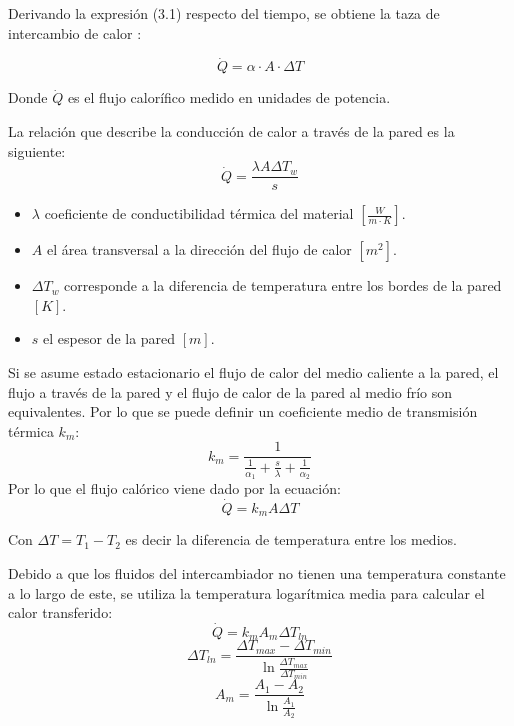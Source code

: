 \documentclass[letterpaper,11pt]{article} %
\begin{document}
 Derivando la expresión (3.1) respecto del tiempo, se obtiene la taza de intercambio de calor :
 
 \begin{equation}
     \dot Q = \alpha \cdot A \cdot \Delta T
 \end{equation}

 Donde $\dot Q$ es el flujo calorífico medido en unidades de potencia.
 
La relación que describe la conducción de calor a través de la pared es la siguiente:
\begin{equation}
    \Dot{Q} = \frac{\lambda A \Delta T_w}{s}
\end{equation}
\begin{itemize}
    \item $\lambda$ coeficiente de conductibilidad térmica del material $[\frac{W}{m\cdot K}]$.
    \item $A$ el área transversal a la dirección del flujo de calor $[m^2]$.
    \item $\Delta T_w$ corresponde a la diferencia de temperatura entre los bordes de la pared $[K]$.
    \item $s$ el espesor de la pared $[m]$.
\end{itemize}

Si se asume estado estacionario el flujo de calor del medio caliente a la pared, el flujo a través de la pared y el flujo de calor de la pared al medio frío son equivalentes.  Por lo que se puede definir un coeficiente medio de transmisión térmica $k_m$:
\begin{equation}
    k_m = \frac{1}{\frac{1}{\alpha_1}+\frac{s}{\lambda}+\frac{1}{\alpha_2}}
\end{equation}
Por lo que el flujo calórico viene dado por la ecuación:
\begin{equation}
    \Dot{Q} = k_m A \Delta T
\end{equation}

Con $\Delta T = T_1 - T_2$ es decir la diferencia de temperatura entre los medios.

Debido a que los fluidos del intercambiador no tienen una temperatura constante a lo largo de este, se utiliza la temperatura logarítmica media para calcular el calor transferido:
\begin{equation}
    \Dot{Q} = k_m A_m \Delta T_{ln}
\end{equation}
\begin{equation}
    \Delta T_{ln} = \frac{\Delta T_{max}-\Delta T_{min}}{\ln{ \frac{\Delta T_{max}}{\Delta T_{min}}}}
\end{equation}
\begin{equation}
    A_m = \frac{A_1-A_2}{\ln{\frac{A_1}{A_2}}}
\end{equation}
\end{document}
